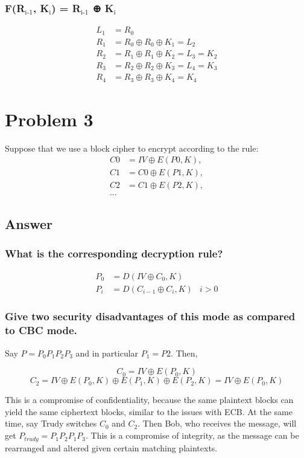 \documentclass[11pt]{article}
\begin{document}
\subsubsection{F(R$_{\text{i-1}}$, K$_{\text{i}}$) = R$_{\text{i-1}}$ ⊕ K$_{\text{i}}$}
\label{sec-2-1-4}
\begin{align*}
L_1 &= R_0 \\
R_1 &= R_0 \oplus R_0 \oplus K_1 = L_2 \\
R_2 &= R_1 \oplus R_1 \oplus K_2 = L_3 = K_2 \\
R_3 &= R_2 \oplus R_2 \oplus K_3 = L_4 = K_3 \\
R_4 &= R_3 \oplus R_3 \oplus K_4 = K_4
\end{align*}
\section{Problem 3}
\label{sec-3}
Suppose that we use a block cipher to encrypt according to the
rule:
\begin{align*}
C0&=IV⊕E(P0, K), \\
C1&=C0⊕E(P1, K), \\
C2&=C1⊕E(P2, K), \\
...
\end{align*}
\subsection{Answer}
\label{sec-3-1}
\subsubsection{What is the corresponding decryption rule?}
\label{sec-3-1-1}
\begin{align*}
P_0 &= D(IV \oplus C_0, K) \\
P_i &= D(C_{i-1} \oplus C_i, K) & i > 0
\end{align*}
\subsubsection{Give two security disadvantages of this mode as compared to CBC mode.}
\label{sec-3-1-2}
Say $P = P_0P_1P_2P_3$ and in particular $P_1=P2$. Then,

\[ C_0 = IV \oplus E(P_0, K) \]
\[ C_2 = IV \oplus E(P_0, K) \oplus E(P_1, K) \oplus E(P_2, K) = IV \oplus E(P_0, K) \]

This is a compromise of confidentiality, because the same
plaintext blocks can yield the same ciphertext blocks, similar to
the issues with ECB. At the same time, say Trudy switches $C_0$
and $C_2$. Then Bob, who receives the message, will get $P_{trudy}
    = P_1P_2P_1P_3$. This is a compromise of integrity, as the message
can be rearranged and altered given certain matching plaintexts.
\end{document}

